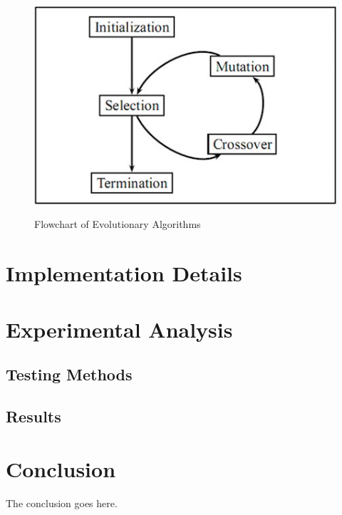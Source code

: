\documentclass[conference,compsoc]{IEEEtran}
\begin{document}
\begin{figure}[h]
  \centering
  \includegraphics[scale=0.4]{EAflow.png}\\
    \caption{Flowchart of Evolutionary Algorithms}
\end{figure}

\section{Implementation Details}

\section{Experimental Analysis}
\subsection{Testing Methods}
\subsection{Results}
\section{Conclusion}
The conclusion goes here.











\end{document}
